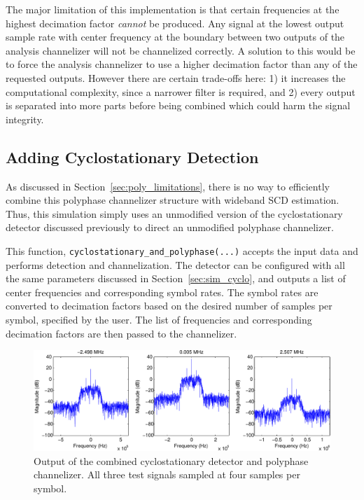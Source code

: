 \documentclass[12pt]{report}
\begin{document}
The major limitation of this implementation is that certain frequencies at the
highest decimation factor \emph{cannot} be produced. Any signal at the lowest
output sample rate with center frequency at the boundary between two outputs of
the analysis channelizer will not be channelized correctly. A solution to this
would be to force the analysis channelizer to use a higher decimation factor
than any of the requested outputs.  However there are certain trade-offs here:
1) it increases the computational complexity, since a narrower filter is
required, and 2) every output is separated into more parts before being
combined which could harm the signal integrity.

\subsection{Adding Cyclostationary Detection}
\label{sec:sim_poly_cyclo}
As discussed in Section~\ref{sec:poly_limitations}, there is no way to
efficiently combine this polyphase channelizer structure with wideband SCD
estimation.  Thus, this simulation simply uses an unmodified version of the
cyclostationary detector discussed previously to direct an unmodified polyphase
channelizer.

This function, \texttt{cyclostationary\_and\_polyphase(...)} accepts the input
data and performs detection and channelization. The detector can be configured
with all the same parameters discussed in Section~\ref{sec:sim_cyclo}, and
outputs a list of center frequencies and corresponding symbol rates.
The symbol rates are converted to decimation factors based on the desired number
of samples per symbol, specified by the user. The list of frequencies and
corresponding decimation factors are then passed to the channelizer.

\begin{figure}[bh!]
    \includegraphics[width=\textwidth]{cyclo_poly_results}%
\caption{Output of the combined cyclostationary detector and polyphase channelizer. All three test signals sampled at four samples per symbol.}
\label{fig:cyclo_poly_results}
\end{figure}
\end{document}
